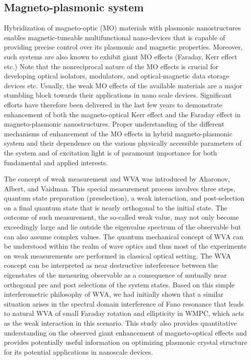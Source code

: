 \documentclass[13pt]{article}
\begin{document}
	\subsection{Magneto-plasmonic system}
	\noindent
	\par
	Hybridization of magneto-optic (MO) materials with plasmonic nanostructures enables magnetic-tuneable multifunctional nano-devices that is capable of providing precise control over its plasmonic and magnetic properties. Moreover, such systems are also known to exhibit giant MO effects (Faraday, Kerr effect etc.)\cite{1.WMPC.MO.effect, 2.WMPC.MO.crystal} Note that the nonreciprocal nature of the MO effects is crucial for developing optical isolators, modulators, and optical-magnetic data storage devices etc. Usually, the weak MO effects of the available materials are a major stumbling block towards their applications in nano scale devices. Significant efforts have therefore been delivered in the last few years to demonstrate enhancement of both the magneto-optical Kerr effect and the Faraday effect in magneto-plasmonic nanostructures.  Proper understanding of the different mechanisms of enhancement of the MO effects in hybrid magneto-plasmonic system and their dependence on the various physically accessible parameters of the system and of excitation light is of paramount importance for both fundamental and applied interests.
	
	\par
	The concept of weak measurement\cite{1.weak.value.sudarshan, 2.weak.measurment.relalization, 3.weak.pre.post.select, 4.weak.detection, 5.weak.fano.relation.pra} and WVA was introduced by Aharonov, Albert, and Vaidman. This special measurement process involves three steps, quantum state preparation (preselection), a weak interaction, and post-selection on a final quantum state that is nearly orthogonal to the initial state. The outcome of such measurement, the so-called weak value, may not only become exceedingly large and lie outside the eigenvalue spectrum of the observable but can also assume complex values. The quantum mechanical concept of WVA can be understood within the realm of wave optics and thus most of the experiments on weak measurements are performed in classical optical setting. The WVA concept can be interpreted as near destructive interference between the eigenstates of the measuring observable as a consequence of mutually near orthogonal pre and post selections of the system states. Based on this simple interferometric philosophy of WVA, we had initially shown that a similar situation arises in the spectral domain interference of Fano resonance\cite{1.fano.spectral, 2.fano.resonance.photonics, 3.fano.resonance.nano, 4.fano.acs, 5.fano.christ} that leads to natural WVA of small Faraday rotation and ellipticity in WMPC, which acts as the weak interaction in this scenario. This study also provides quantitative understanding on the observed giant enhancement of magneto-optical effects and provides potentially useful information on optimizing plasmonic crystal structure for its potential applications in nanoscale devices.
\end{document}
